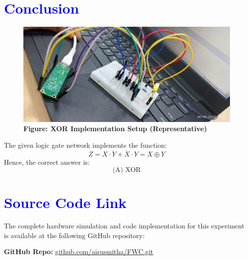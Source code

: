 \documentclass[twocolumn]{article}
\begin{document}
\section*{\textcolor{blue}{Conclusion}}
\begin{figure}[h]
    \centering
    \includegraphics[width=0.9\linewidth]{Assembly.jpg}
        \caption*{\textbf{Figure: XOR Implementation Setup (Representative)}}
\end{figure}

The given logic gate network implements the function:
\[
Z = X \cdot \overline{Y} + \overline{X} \cdot Y = X \oplus Y
\]
Hence, the correct answer is:
\[
\boxed{\text{(A) XOR}}
\]

\section*{\textcolor{blue}{Source Code Link}}
The complete hardware simulation and code implementation for this experiment is available at the following GitHub repository:

\textbf{GitHub Repo:} \href{https://github.com/aisusmitha/FWC.git}{github.com/aisusmitha/FWC.git}
\end{document}
